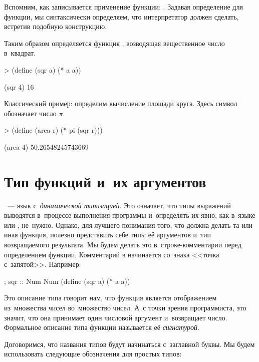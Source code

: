 Вспомним, как записывается применение функции: . Задавая определение для функции, мы синтаксически определяем, что интерпретатор должен сделать, встретив подобную конструкцию.

\begin{example}{%
Таким образом определяется функция , возводящая вещественное число в~квадрат.}
\begin{ExampleCode}
> (define (sqr a)
    (* a a))
\end{ExampleCode}
\REPL
  {(sqr 4)}
  {16}
\end{example}

\begin{example}{%
Классический пример: определим вычисление площади круга. Здесь символ  обозначает число $\pi$.}
\begin{ExampleCode}
> (define (area r)
    (* pi (sqr r)))
\end{ExampleCode}
\REPL
  {(area 4)}
  {50.26548245743669}
\end{example}

\section{Тип функций и~их аргументов}%
\Scheme~--- язык с~\emph{динамической типизацией}. Это означает, что типы выражений выводятся в~процессе выполнения программы и~определять их явно, как в~языке  или , не~нужно. Однако, для лучшего понимания того, что должна делать та или иная функция, полезно представить себе типы её аргументов и~тип возвращаемого результата. Мы будем делать это в~строке-комментарии перед определением функции. Комментарий в \Scheme начинается со~знака <<точка с~запятой>>. Например:

\begin{Definition}
; sqr :: Num \arrow Num
(define (sqr a)
  (* a a))
\end{Definition}

Это описание типа говорит нам, что функция  является отображением из~множества чисел во~множество чисел. А~с точки зрения программиста, это значит, что она принимает один числовой аргумент и~возвращает число. Формальное описание типа функции называется её \emph{сигнатурой}.

Договоримся, что названия типов будут начинаться с~заглавной буквы. Мы будем использовать следующие обозначения для простых типов:

